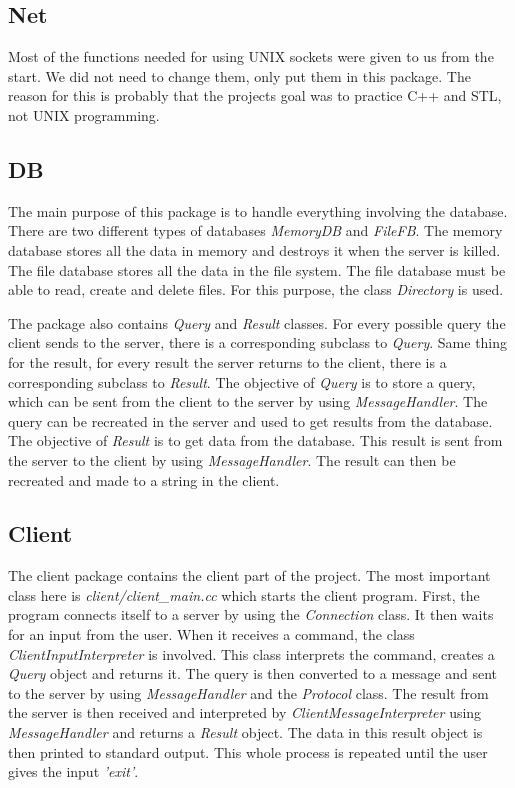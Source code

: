 \documentclass[10pt, a4paper]{article}
\begin{document}
\subsection{Net}
Most of the functions needed for using UNIX sockets were given to us from the start. We did not need to change them, only put them in this package. The reason for this is probably that the projects goal was to practice C++ and STL, not UNIX programming.

\subsection{DB}
The main purpose of this package is to handle everything involving the database. There are two different types of databases \emph{MemoryDB} and \emph{FileFB}. The memory database stores all the data in memory and destroys it when the server is killed. The file database stores all the data in the file system. The file database must be able to read, create and delete files. For this purpose, the class \emph{Directory} is used.

The package also contains \emph{Query} and \emph{Result} classes. For every possible query the client sends to the server, there is a corresponding subclass to \emph{Query}. Same thing for the result, for every result the server returns to the client, there is a corresponding subclass to \emph{Result}. The objective of \emph{Query} is to store a query, which can be sent from the client to the server by using \emph{MessageHandler}. The query can be recreated in the server and used to get results from the database. The objective of \emph{Result} is to get data from the database. This result is sent from the server to the client by using \emph{MessageHandler}. The result can then be recreated and made to a string in the client.

\subsection{Client}
The client package contains the client part of the project. The most important class here is \emph{client/client\_main.cc} which starts the client program. First, the program connects itself to a server by using the \emph{Connection} class. It then waits for an input from the user. When it receives a command, the class \emph{ClientInputInterpreter} is involved. This class interprets the command, creates a \emph{Query} object and returns it. The query is then converted to a message and sent to the server by using \emph{MessageHandler} and the \emph{Protocol} class. The result from the server is then received and interpreted by \emph{ClientMessageInterpreter} using \emph{MessageHandler} and returns a \emph{Result} object. The data in this result object is then printed to standard output. This whole process is repeated until the user gives the input \emph{'exit'}.
\end{document}
